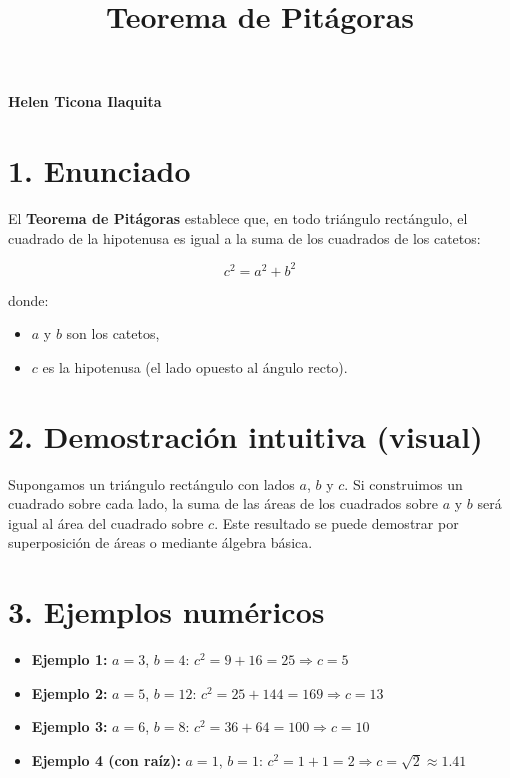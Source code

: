 \documentclass[11pt]{article}
\title{\vspace{-2cm}Teorema de Pitágoras}
\date{}
\begin{document}
\maketitle

\begin{center}
\large \textbf{Helen Ticona Ilaquita}
\end{center}

\vspace{0.4cm}

\section*{1. Enunciado}

El \textbf{Teorema de Pitágoras} establece que, en todo triángulo rectángulo, el cuadrado de la hipotenusa es igual a la suma de los cuadrados de los catetos:

\[
c^2 = a^2 + b^2
\]

donde:
\begin{itemize}
    \item \(a\) y \(b\) son los catetos,
    \item \(c\) es la hipotenusa (el lado opuesto al ángulo recto).
\end{itemize}

\section*{2. Demostración intuitiva (visual)}

Supongamos un triángulo rectángulo con lados \(a\), \(b\) y \(c\). Si construimos un cuadrado sobre cada lado, la suma de las áreas de los cuadrados sobre \(a\) y \(b\) será igual al área del cuadrado sobre \(c\). Este resultado se puede demostrar por superposición de áreas o mediante álgebra básica.

\section*{3. Ejemplos numéricos}

\begin{itemize}
    \item \textbf{Ejemplo 1:} \(a = 3\), \(b = 4\): \quad \(c^2 = 9 + 16 = 25 \Rightarrow c = 5\)
    \item \textbf{Ejemplo 2:} \(a = 5\), \(b = 12\): \quad \(c^2 = 25 + 144 = 169 \Rightarrow c = 13\)
    \item \textbf{Ejemplo 3:} \(a = 6\), \(b = 8\): \quad \(c^2 = 36 + 64 = 100 \Rightarrow c = 10\)
    \item \textbf{Ejemplo 4 (con raíz):} \(a = 1\), \(b = 1\): \quad \(c^2 = 1 + 1 = 2 \Rightarrow c = \sqrt{2} \approx 1.41\)
\end{itemize}
\end{document}
